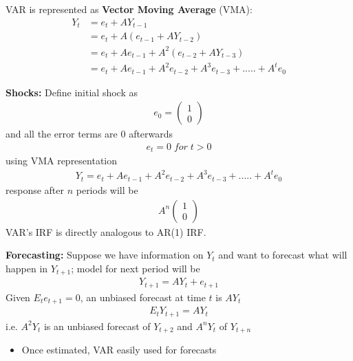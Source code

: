 \documentclass{beamer}
\begin{document}
\begin{frame}
  VAR is represented as \textbf{Vector Moving Average} (VMA):
  \begin{align}
    Y_t &= e_t + AY_{t-1}\\ \nonumber
        &= e_t + A(e_{t-1} + AY_{t-2})\\ \nonumber
        &= e_t + Ae_{t-1} + A^2(e_{t-2} + AY_{t-3})\\ \nonumber
        &= e_t + Ae_{t-1} + A^2e_{t-2} + A^3e_{t-3} + ..... + A^te_0  
  \end{align}
\end{frame}

\begin{frame}
\textbf{Shocks:} Define initial shock as
\begin{align}  
  e_0=\begin{pmatrix}   1 \\ 0   \end{pmatrix} 
\end{align}
and all the error terms are 0 afterwards
\begin{align}
 e_t=0\;for\;t>0 
\end{align}
using VMA representation
\begin{align} 
Y_t = e_t + Ae_{t-1} + A^2e_{t-2} + A^3e_{t-3} + ..... + A^te_0 
\end{align}
response after $n$ periods will be 
\begin{align}
  A^n \begin{pmatrix} 1 \\ 0  \end{pmatrix}
\end{align}
VAR's IRF is directly analogous to AR(1) IRF.
\end{frame}

\begin{frame}
 \textbf{Forecasting:}
  Suppose we have information on $Y_t$ and want to forecast what will happen in $Y_{t+1}$;
  model for next period will be
  \begin{align}  
  Y_{t+1} = AY_t + e_{t+1} 
  \end{align}
  Given $E_te_{t+1}= 0$, an unbiased forecast at time $t$ is $AY_t$ 
  \begin{align} 
  E_tY_{t+1} = AY_t 
  \end{align}
  i.e.  $A^2Y_t$ is an unbiased forecast of $Y_{t+2}$ and $A^nY_t$ of $Y_{t+n}$
  \begin{itemize}
    \item Once estimated, VAR easily used for forecasts
  \end{itemize}
\end{frame}
\end{document}
